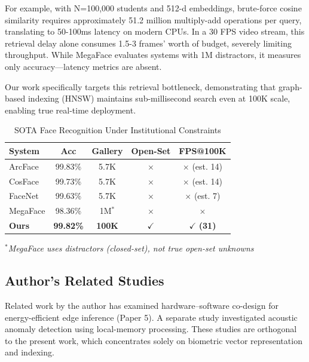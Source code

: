 \documentclass[conference]{IEEEtran}
\begin{document}
For example, with N=100,000 students and 512-d embeddings, brute-force cosine similarity requires approximately 51.2 million multiply-add operations per query, translating to 50-100ms latency on modern CPUs. In a 30 FPS video stream, this retrieval delay alone consumes 1.5-3 frames' worth of budget, severely limiting throughput. While MegaFace evaluates systems with 1M distractors, it measures only accuracy—latency metrics are absent.

Our work specifically targets this retrieval bottleneck, demonstrating that graph-based indexing (HNSW) maintains sub-millisecond search even at 100K scale, enabling true real-time deployment.

\begin{table}[htbp]
\caption{SOTA Face Recognition Under Institutional Constraints}
\begin{center}
\begin{tabular}{|l|c|c|c|c|}
\hline
\textbf{System} & \textbf{Acc} & \textbf{Gallery} & \textbf{Open-Set} & \textbf{FPS@100K} \\
\hline
ArcFace \cite{b5} & 99.83\% & 5.7K & $\times$ & $\times$ (est. 14) \\
\hline
CosFace \cite{cosface} & 99.73\% & 5.7K & $\times$ & $\times$ (est. 14) \\
\hline
FaceNet \cite{b18} & 99.63\% & 5.7K & $\times$ & $\times$ (est. 7) \\
\hline
MegaFace \cite{megaface} & 98.36\% & 1M$^*$ & $\times$ & $\times$ \\
\hline
\textbf{Ours} & \textbf{99.82\%} & \textbf{100K} & $\checkmark$ & $\checkmark$ \textbf{(31)} \\
\hline
\end{tabular}
\end{center}
\label{tab:sota_constraints}
\textit{$^*$MegaFace uses distractors (closed-set), not true open-set unknowns}
\end{table}

\subsection{Author's Related Studies}
Related work by the author has examined hardware–software co-design for energy-efficient edge inference (Paper 5). A separate study investigated acoustic anomaly detection using local-memory processing. These studies are orthogonal to the present work, which concentrates solely on biometric vector representation and indexing.
\end{document}
